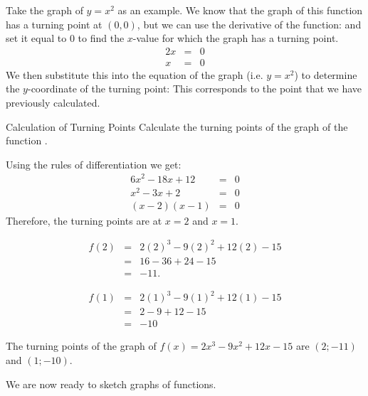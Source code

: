 
Take the graph of $y=x^2$ as an example. We know that the graph of this function has a turning point at $(0,0)$, but we can use the derivative of the function:
and set it equal to $0$ to find the $x$-value for which the graph has a turning point.
\begin{eqnarray*}
2x&=&0\\
x&=&0
\end{eqnarray*}
We then substitute this into the equation of the graph (i.e. $y=x^2$) to determine the $y$-coordinate of the turning point:
This corresponds to the point that we have previously calculated.

\begin{wex}{Calculation of Turning Points}
{Calculate the turning points of the graph of the function .}
{
Using the rules of differentiation we get:
\begin{eqnarray*}
6x^2-18x+12&=&0\\
x^2-3x+2&=&0\\
(x-2)(x-1)&=&0
\end{eqnarray*}
Therefore, the turning points are at $x=2$ and $x=1$.

\begin{eqnarray*}
f(2)&=&2(2)^3-9(2)^2+12(2)-15\\
&=&16-36+24-15\\
&=&-11.
\end{eqnarray*}

\begin{eqnarray*}
f(1)&=&2(1)^3-9(1)^2+12(1)-15\\
&=&2-9+12-15\\
&=&-10
\end{eqnarray*}

The turning points of the graph of $f(x)=2x^3 - 9x^2 + 12x - 15$ are $(2;-11)$ and $(1;-10)$.}
\end{wex}

We are now ready to sketch graphs of functions.


